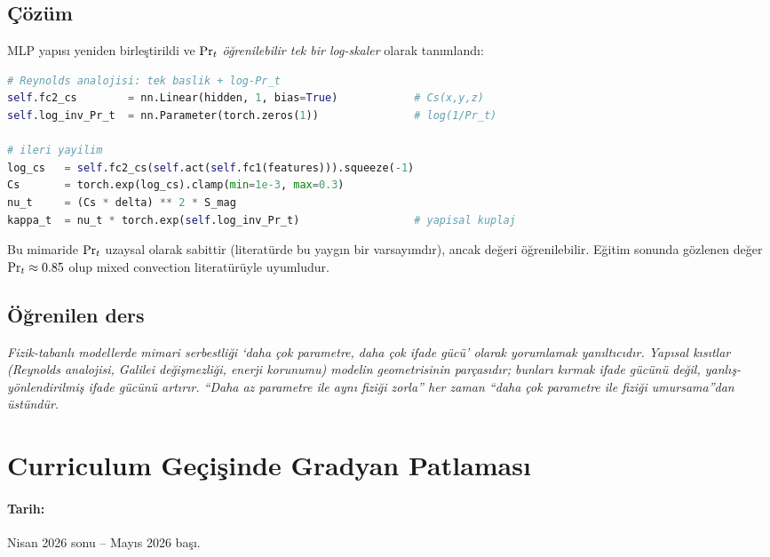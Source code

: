 \subsection*{Çözüm}

MLP yapısı yeniden birleştirildi ve $\mathrm{Pr}_t$ \textit{öğrenilebilir tek bir log-skaler} olarak tanımlandı:

\begin{lstlisting}[language=Python,caption={Yapısal Reynolds analojisi: birleşik başlık}]
# Reynolds analojisi: tek baslik + log-Pr_t
self.fc2_cs        = nn.Linear(hidden, 1, bias=True)            # Cs(x,y,z)
self.log_inv_Pr_t  = nn.Parameter(torch.zeros(1))               # log(1/Pr_t)

# ileri yayilim
log_cs   = self.fc2_cs(self.act(self.fc1(features))).squeeze(-1)
Cs       = torch.exp(log_cs).clamp(min=1e-3, max=0.3)
nu_t     = (Cs * delta) ** 2 * S_mag
kappa_t  = nu_t * torch.exp(self.log_inv_Pr_t)                  # yapisal kuplaj
\end{lstlisting}

Bu mimaride $\mathrm{Pr}_t$ uzaysal olarak sabittir (literatürde bu yaygın bir varsayımdır), ancak değeri öğrenilebilir. Eğitim sonunda gözlenen değer $\mathrm{Pr}_t \approx 0.85$ olup mixed convection literatürüyle uyumludur.

\subsection*{Öğrenilen ders}

\begin{remark}
\textit{Fizik-tabanlı modellerde mimari serbestliği `daha çok parametre, daha çok ifade gücü' olarak yorumlamak yanıltıcıdır. Yapısal kısıtlar (Reynolds analojisi, Galilei değişmezliği, enerji korunumu) modelin geometrisinin parçasıdır; bunları kırmak ifade gücünü değil, yanlış-yönlendirilmiş ifade gücünü artırır. ``Daha az parametre ile aynı fiziği zorla'' her zaman ``daha çok parametre ile fiziği umursama''dan üstündür.}
\end{remark}


\section{Curriculum Geçişinde Gradyan Patlaması}
\label{sec:bug_grad_spike}

\paragraph{Tarih:} Nisan 2026 sonu -- Mayıs 2026 başı.

